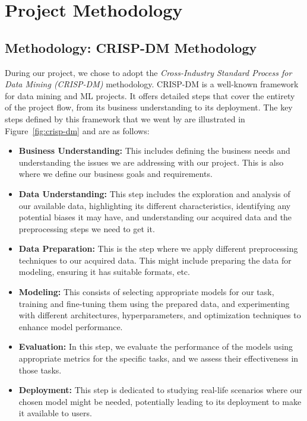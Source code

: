\section{Project Methodology}
\subsection{Methodology: CRISP-DM Methodology}

During our project, we chose to adopt the \textit{Cross-Industry Standard Process for Data Mining (CRISP-DM)} methodology. CRISP-DM is a well-known framework for data mining and ML projects. It offers detailed steps that cover the entirety of the project flow, from its business understanding to its deployment. The key steps defined by this framework that we went by are illustrated in Figure~\ref{fig:crisp-dm} and are as follows:

\begin{itemize}
    \item \textbf{Business Understanding:} This includes defining the business needs and understanding the issues we are addressing with our project. This is also where we define our business goals and requirements.

    \item \textbf{Data Understanding:} This step includes the exploration and analysis of our available data, highlighting its different characteristics, identifying any potential biases it may have, and understanding our acquired data and the preprocessing steps we need to get it.

    \item \textbf{Data Preparation:} This is the step where we apply different preprocessing techniques to our acquired data. This might include preparing the data for modeling, ensuring it has suitable formats, etc.

    \item \textbf{Modeling:} This consists of selecting appropriate models for our task, training and fine-tuning them using the prepared data, and experimenting with different architectures, hyperparameters, and optimization techniques to enhance model performance.

    \item \textbf{Evaluation:} In this step, we evaluate the performance of the models using appropriate metrics for the specific tasks, and we assess their effectiveness in those tasks.

    \item \textbf{Deployment:} This step is dedicated to studying real-life scenarios where our chosen model might be needed, potentially leading to its deployment to make it available to users.
\end{itemize}

